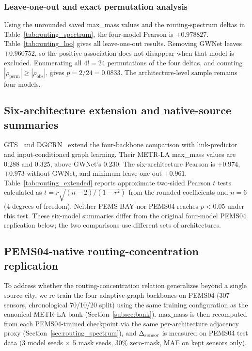 \subsubsection{Leave-one-out and exact permutation analysis}
\label{sec:appendix_routing_loo}

Using the unrounded saved max\_mass values and the routing-spectrum deltas in
Table~\ref{tab:routing_spectrum}, the four-model Pearson is $+0.978827$.
Table~\ref{tab:routing_loo} gives all leave-one-out results. Removing GWNet
leaves $+0.960752$, so the positive association does not disappear when that
model is excluded. Enumerating all $4!{=}24$ permutations of the four deltas,
and counting $|\rho_{\mathrm{perm}}|\geq|\rho_{\mathrm{obs}}|$, gives
$p{=}2/24{=}0.0833$. The architecture-level sample remains four models.



\subsection{Six-architecture extension and native-source summaries}
\label{sec:appendix_routing_extended}

GTS~\citep{shang2021discrete} and DGCRN~\citep{li2023dgcrn} extend the
four-backbone comparison with link-predictor and input-conditioned graph
learning. Their METR-LA max\_mass values are 0.288 and 0.325,
above GWNet's 0.230. The six-architecture Pearson is
$+0.974$, $+0.973$ without GWNet, and minimum leave-one-out $+0.961$.
Table~\ref{tab:routing_extended} reports approximate two-sided Pearson $t$ tests
calculated as $t=r\sqrt{(n-2)/(1-r^2)}$ from the rounded coefficients and
$n=6$ ($4$ degrees of freedom).
Neither PEMS-BAY nor PEMS04 reaches $p<0.05$ under this test.
These six-model summaries differ from the original four-model PEMS04
replication below; the two comparisons use different sets of architectures.



\subsection{PEMS04-native routing-concentration replication}
\label{sec:appendix_pems04_routing}

To address whether the routing-concentration relation generalizes beyond a single source
city, we re-train the four adaptive-graph backbones on PEMS04 (307 sensors,
chronological 70/10/20 split) using the same training configuration as the
canonical METR-LA bank (Section~\ref{subsec:bank}). $\text{max\_mass}$ is then
recomputed from each PEMS04-trained checkpoint via the same per-architecture
adjacency proxy (Section~\ref{sec:routing_spectrum}), and $\Delta_{\text{sensor}}$ is
measured on PEMS04 test data (3 model seeds $\times$ 5 mask seeds, 30\%
zero-mask, MAE on kept sensors only).

